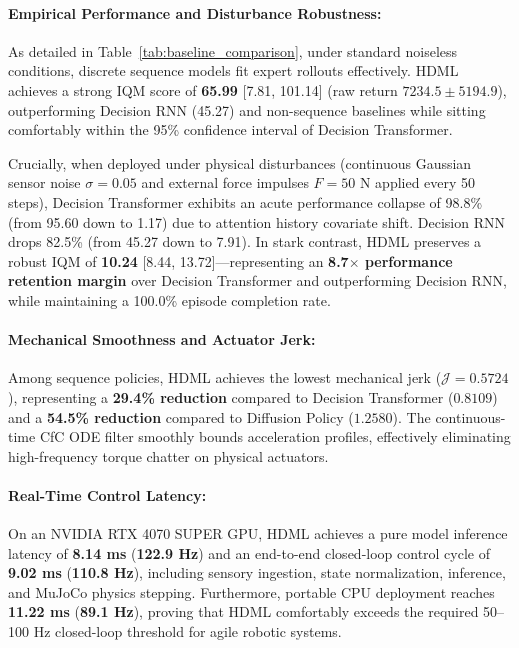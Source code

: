 \documentclass{article}
\begin{document}
\paragraph{Empirical Performance and Disturbance Robustness:}
As detailed in Table~\ref{tab:baseline_comparison}, under standard noiseless conditions, discrete sequence models fit expert rollouts effectively. HDML achieves a strong IQM score of \textbf{65.99} [7.81, 101.14] (raw return $7234.5 \pm 5194.9$), outperforming Decision RNN (45.27) and non-sequence baselines while sitting comfortably within the 95\% confidence interval of Decision Transformer. 

Crucially, when deployed under physical disturbances (continuous Gaussian sensor noise $\sigma=0.05$ and external force impulses $F=50\text{ N}$ applied every 50 steps), Decision Transformer exhibits an acute performance collapse of 98.8\% (from 95.60 down to 1.17) due to attention history covariate shift. Decision RNN drops 82.5\% (from 45.27 down to 7.91). In stark contrast, HDML preserves a robust IQM of \textbf{10.24} [8.44, 13.72]---representing an \textbf{8.7$\times$ performance retention margin} over Decision Transformer and outperforming Decision RNN, while maintaining a 100.0\% episode completion rate.

\paragraph{Mechanical Smoothness and Actuator Jerk:}
Among sequence policies, HDML achieves the lowest mechanical jerk ($\mathcal{J} = 0.5724$), representing a \textbf{29.4\% reduction} compared to Decision Transformer ($0.8109$) and a \textbf{54.5\% reduction} compared to Diffusion Policy ($1.2580$). The continuous-time CfC ODE filter smoothly bounds acceleration profiles, effectively eliminating high-frequency torque chatter on physical actuators.

\paragraph{Real-Time Control Latency:}
On an NVIDIA RTX 4070 SUPER GPU, HDML achieves a pure model inference latency of \textbf{8.14 ms} (\textbf{122.9 Hz}) and an end-to-end closed-loop control cycle of \textbf{9.02 ms} (\textbf{110.8 Hz}), including sensory ingestion, state normalization, inference, and MuJoCo physics stepping. Furthermore, portable CPU deployment reaches \textbf{11.22 ms} (\textbf{89.1 Hz}), proving that HDML comfortably exceeds the required 50--100 Hz closed-loop threshold for agile robotic systems.
\end{document}
